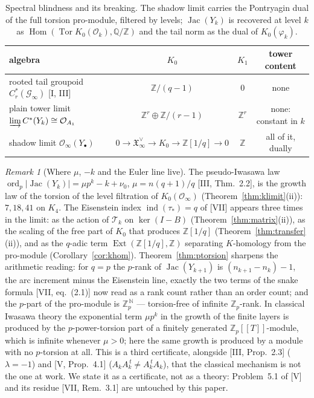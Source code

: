 \documentclass[11pt]{amsart}
\numberwithin{equation}{section}
\theoremstyle{definition}
\theoremstyle{remark}
\newtheorem{remark}[theorem]{Remark}
\newcommand{\Z}{\mathbb{Z}}
\newcommand{\Q}{\mathbb{Q}}
\newcommand{\Zp}{\Z_p}
\newcommand{\cO}{\mathcal{O}}
\newcommand{\cT}{\mathcal{T}}
\newcommand{\XX}{\mathfrak{X}_\infty}
\newcommand{\Jac}{\operatorname{Jac}}
\newcommand{\Tor}{\operatorname{Tor}}
\newcommand{\Hom}{\operatorname{Hom}}
\newcommand{\Ext}{\operatorname{Ext}}
\newcommand{\ord}{\operatorname{ord}}
\newcommand{\ind}{\operatorname{ind}}
\newcommand{\ta}{\tau_*}
\newcommand{\Tdn}{\cT_{k}}
\begin{document}
\begin{table}[ht]
\centering\small
\renewcommand{\arraystretch}{1.25}
\begin{tabular}{lccc}
\toprule
algebra & $K_0$ & $K_1$ & tower content\\
\midrule
rooted tail groupoid $C^*_r(\mathcal G_\infty)$ [I, III] & $\Z/(q-1)$ & $0$ & none\\
plain tower limit $\varinjlim C^*(Y_k)\cong\cO_{A_1}$ & $\Z^{r}\oplus\Z/(r-1)$ & $\Z^{r}$ & none: constant in $k$\\
shadow limit $\cO_\infty(Y_\bullet)$ & $0\to\XX^{\vee}\to K_0\to\Z[1/q]\to0$ & $\Z$ & all of it, dually\\
\bottomrule
\end{tabular}
\medskip
\caption{Spectral blindness and its breaking. The shadow limit carries the Pontryagin
dual of the full torsion pro-module, filtered by levels; $\Jac(Y_k)$ is recovered at
level $k$ as $\Hom(\Tor K_0(\cO_k),\Q/\Z)$ and the tail norm as the dual of
$K_0(\varphi_k)$.}
\label{tab:compare}
\end{table}

\begin{remark}[Where $\mu$, $-k$ and the Euler line live]\label{rem:euler}
The pseudo-Iwasawa law $\ord_p|\Jac(Y_k)|=\mu p^k-k+\nu_0$, $\mu=n(q{+}1)/q$
[III, Thm.~2.2], is the growth law of the torsion of the level filtration of
$K_0(\cO_\infty)$ (Theorem~\ref{thm:klimit}(ii)): $7,18,41$ on $K_4$. The Eisenstein index
$\ind(\ta)=q$ of [VII] appears three times in the limit: as the action of $\Tdn$ on
$\ker(I-B)$ (Theorem~\ref{thm:matrix}(ii)), as the scaling of the free part of $K_0$ that
produces $\Z[1/q]$ (Theorem~\ref{thm:transfer}(ii)), and as the $q$-adic term
$\Ext(\Z[1/q],\Z)$ separating $K$-homology from the pro-module (Corollary~\ref{cor:khom}).
Theorem~\ref{thm:ptorsion} sharpens the arithmetic reading: for $q=p$ the $p$-rank of
$\Jac(Y_{k+1})$ is $(n_{k+1}-n_k)-1$, the arc increment minus the Eisenstein line, exactly
the two terms of the snake formula [VII, eq.~(2.1)] now read as a rank count rather than
an order count; and the $p$-part of the pro-module is $\Zp^{\,\mathbb N}$ --- torsion-free
of infinite $\Zp$-rank. In classical Iwasawa theory the exponential term $\mu p^k$ in the
growth of the finite layers is produced by the $p$-power-torsion part of a finitely
generated $\Zp[[T]]$-module, which is infinite whenever $\mu>0$; here the same growth is
produced by a module with no $p$-torsion at all. This is a third certificate, alongside
[III, Prop.~2.3] ($\lambda=-1$) and [V, Prop.~4.1] ($A_kA_k^{\,t}\ne A_k^{\,t}A_k$), that
the classical mechanism is not the one at work. We state it as a certificate, not as a
theory: Problem~5.1 of [V] and its residue [VII, Rem.~3.1] are untouched by this paper.
\end{remark}
\end{document}
